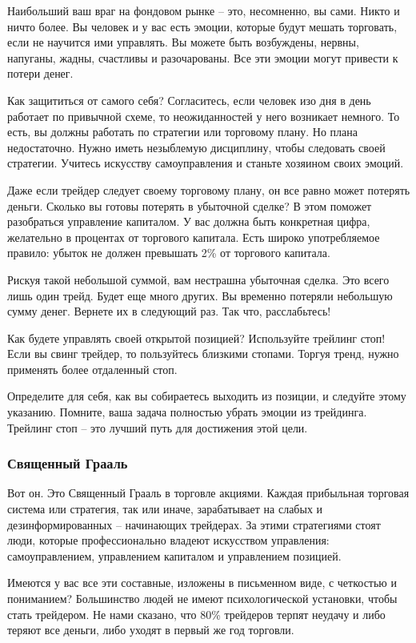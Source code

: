 \documentclass[a5paper]{article}
\begin{document}
Наибольший ваш враг на фондовом рынке – это, несомненно, вы сами. Никто и ничто более. Вы человек и у вас есть эмоции, которые будут мешать торговать, если не научится ими управлять. Вы можете быть возбуждены, нервны, напуганы, жадны, счастливы и разочарованы. Все эти эмоции могут привести к потери денег.

Как защититься от самого себя? Согласитесь, если человек изо дня в день работает по привычной схеме, то неожиданностей у него возникает немного. То есть, вы должны работать по стратегии или торговому плану. Но плана недостаточно. Нужно иметь незыблемую дисциплину, чтобы следовать своей стратегии. Учитесь искусству самоуправления и станьте хозяином своих эмоций.

Даже если трейдер следует своему торговому плану, он все равно может потерять деньги. Сколько вы готовы потерять в убыточной сделке? В этом поможет разобраться управление капиталом. У вас должна быть конкретная цифра, желательно в процентах от торгового капитала. Есть широко употребляемое правило: убыток не должен превышать 2\% от торгового капитала.

Рискуя такой небольшой суммой, вам нестрашна убыточная сделка. Это всего лишь один трейд. Будет еще много других. Вы временно потеряли небольшую сумму денег. Вернете их в следующий раз. Так что, расслабьтесь!

Как будете управлять своей открытой позицией? Используйте трейлинг стоп! Если вы свинг трейдер, то пользуйтесь близкими стопами. Торгуя тренд, нужно применять более отдаленный стоп.

Определите для себя, как вы собираетесь выходить из позиции, и
следуйте этому указанию. Помните, ваша задача полностью убрать эмоции
из трейдинга. Трейлинг стоп – это лучший путь для достижения этой
цели.

\subsubsection{Священный Грааль}

Вот он. Это Священный Грааль в торговле акциями. Каждая прибыльная торговая система или стратегия, так или иначе, зарабатывает на слабых и дезинформированных – начинающих трейдерах. За этими стратегиями стоят люди, которые профессионально владеют искусством управления: самоуправлением, управлением капиталом и управлением позицией.

Имеются у вас все эти составные, изложены в письменном виде, с четкостью и пониманием? Большинство людей не имеют психологической установки, чтобы стать трейдером. Не нами сказано, что 80\% трейдеров терпят неудачу и либо теряют все деньги, либо уходят в первый же год торговли.
\end{document}
